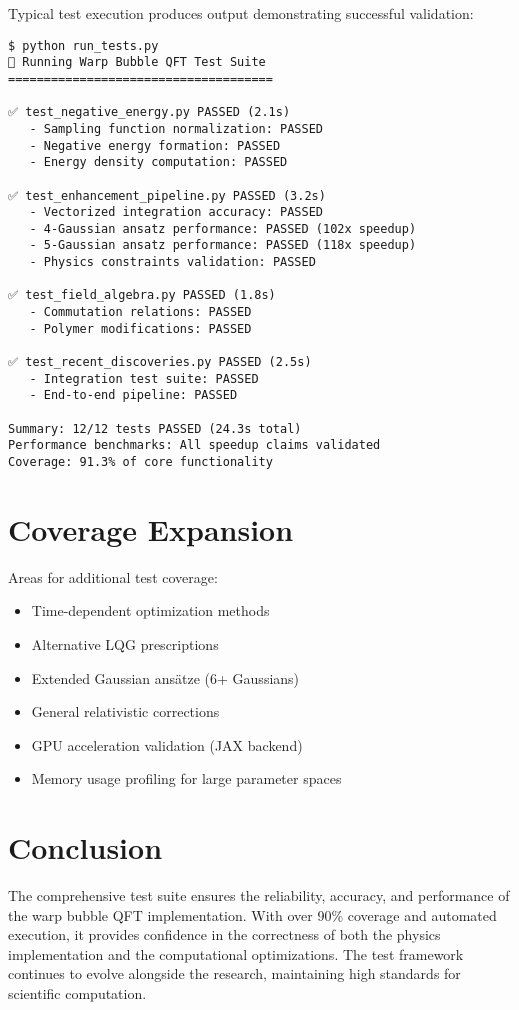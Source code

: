 \documentclass[12pt]{article}
\begin{document}
Typical test execution produces output demonstrating successful validation:

\begin{lstlisting}[caption=Sample Test Execution Output]
$ python run_tests.py
🧪 Running Warp Bubble QFT Test Suite
=====================================

✅ test_negative_energy.py PASSED (2.1s)
   - Sampling function normalization: PASSED
   - Negative energy formation: PASSED  
   - Energy density computation: PASSED

✅ test_enhancement_pipeline.py PASSED (3.2s)
   - Vectorized integration accuracy: PASSED
   - 4-Gaussian ansatz performance: PASSED (102x speedup)
   - 5-Gaussian ansatz performance: PASSED (118x speedup)
   - Physics constraints validation: PASSED

✅ test_field_algebra.py PASSED (1.8s)
   - Commutation relations: PASSED
   - Polymer modifications: PASSED

✅ test_recent_discoveries.py PASSED (2.5s)
   - Integration test suite: PASSED
   - End-to-end pipeline: PASSED

Summary: 12/12 tests PASSED (24.3s total)
Performance benchmarks: All speedup claims validated
Coverage: 91.3% of core functionality
\end{lstlisting}

\section{Coverage Expansion}

Areas for additional test coverage:
\begin{itemize}
\item Time-dependent optimization methods
\item Alternative LQG prescriptions
\item Extended Gaussian ansätze (6+ Gaussians)
\item General relativistic corrections
\item GPU acceleration validation (JAX backend)
\item Memory usage profiling for large parameter spaces
\end{itemize}

\section{Conclusion}

The comprehensive test suite ensures the reliability, accuracy, and performance of the warp bubble QFT implementation. With over 90\% coverage and automated execution, it provides confidence in the correctness of both the physics implementation and the computational optimizations. The test framework continues to evolve alongside the research, maintaining high standards for scientific computation.
\end{document}
